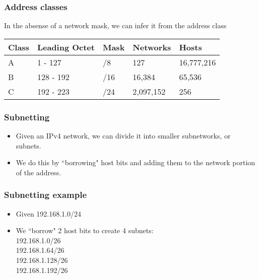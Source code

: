 \documentclass[10pt]{beamer}
\begin{document}
\begin{frame}
  \frametitle{Address classes}
  In the absense of a network mask, we can infer it from the address class

 \begin{tabular}{|l|l|l|l|l|}
  \hline
  Class & Leading Octet & Mask & Networks  & Hosts \\ \hline
  A     & 1 - 127       & /8   & 127       & 16,777,216  \\ \hline
  B     & 128 - 192     & /16  & 16,384    & 65,536  \\ \hline
  C     & 192 - 223     & /24  & 2,097,152 &  256 \\ \hline
 
 \end{tabular}

\end{frame}


\begin{frame}
  \frametitle{Subnetting}

 \begin{itemize}
  \item Given an IPv4 network, we can divide it into smaller subnetworks, or subnets.
  \item We do this by ``borrowing" host bits and adding them to the network portion of the address.
 \end{itemize}

\end{frame}


\begin{frame}
  \frametitle{Subnetting example}

 \begin{itemize}
  \item Given 192.168.1.0/24
  \item We ``borrow" 2 host bits to create 4 subnets: \\
        192.168.1.0/26 \\
        192.168.1.64/26 \\
        192.168.1.128/26 \\
        192.168.1.192/26 
 \end{itemize}

\end{frame}
\end{document}
